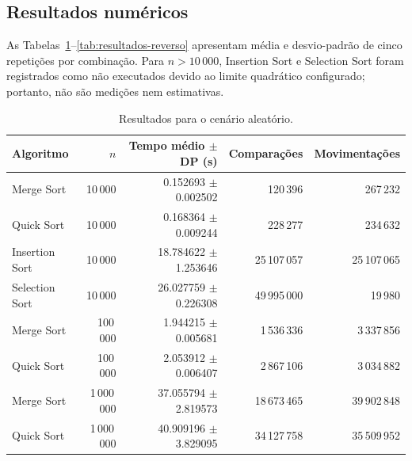 \subsection{Resultados numéricos}

As Tabelas~\ref{tab:resultados-aleatorio}--\ref{tab:resultados-reverso}
apresentam média e desvio-padrão de cinco repetições por combinação. Para
$n>10\,000$, Insertion Sort e Selection Sort foram registrados como não
executados devido ao limite quadrático configurado; portanto, não são medições
nem estimativas.

\begin{table}[H]
\centering
\caption{Resultados para o cenário aleatório.}
\label{tab:resultados-aleatorio}
\footnotesize
\setlength{\tabcolsep}{3pt}
\begin{tabular}{lrrrr}
\toprule
Algoritmo & $n$ & Tempo médio $\pm$ DP (s) & Comparações & Movimentações \\
\midrule
Merge Sort & 10\,000 & 0.152693 $\pm$ 0.002502 & 120\,396 & 267\,232 \\
Quick Sort & 10\,000 & 0.168364 $\pm$ 0.009244 & 228\,277 & 234\,632 \\
Insertion Sort & 10\,000 & 18.784622 $\pm$ 1.253646 & 25\,107\,057 & 25\,107\,065 \\
Selection Sort & 10\,000 & 26.027759 $\pm$ 0.226308 & 49\,995\,000 & 19\,980 \\
Merge Sort & 100\,000 & 1.944215 $\pm$ 0.005681 & 1\,536\,336 & 3\,337\,856 \\
Quick Sort & 100\,000 & 2.053912 $\pm$ 0.006407 & 2\,867\,106 & 3\,034\,882 \\
Merge Sort & 1\,000\,000 & 37.055794 $\pm$ 2.819573 & 18\,673\,465 & 39\,902\,848 \\
Quick Sort & 1\,000\,000 & 40.909196 $\pm$ 3.829095 & 34\,127\,758 & 35\,509\,952 \\
\bottomrule
\end{tabular}
\end{table}

